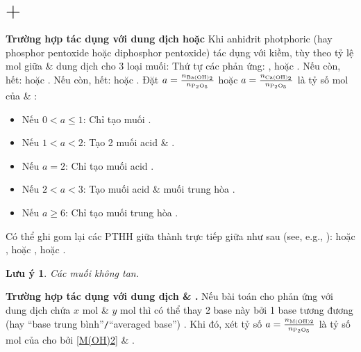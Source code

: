 \documentclass{article}
\newtheorem{luuy}{Lưu ý}
\begin{document}

\section{ $+$ }
\noindent\textbf{\textsf{Trường hợp  tác dụng với dung dịch  hoặc }} Khi anhiđrit photphoric (hay phosphor pentoxide hoặc diphosphor pentoxide)  tác dụng với kiềm, tùy theo tỷ lệ mol giữa  \& dung dịch  cho 3 loại muối: Thứ tự các phản ứng: ,  hoặc . Nếu  còn,  hết:  hoặc . Nếu  còn,  hết:  hoặc . Đặt $a = \frac{n_{\ce{Ba(OH)2}}}{n_{\ce{P2O5}}}$ hoặc $a = \frac{n_{\ce{Ca(OH)2}}}{n_{\ce{P2O5}}}$ là tỷ số mol của  \& :
\begin{itemize}
	\item Nếu $0 < a\le1$: Chỉ tạo muối .
	\item Nếu $1 < a < 2$: Tạo 2 muối acid  \& .
	\item Nếu $a = 2$: Chỉ tạo muối acid .
	\item Nếu $2 < a < 3$: Tạo muối acid  \& muối trung hòa .
	\item Nếu $a\ge6$: Chỉ tạo muối trung hòa .
\end{itemize}
Có thể ghi gom lại các {\rm PTHH} giữa  thành trực tiếp giữa  như sau (see, e.g., \cite[pp. 204--205]{An_chuoi_PUHH}):  hoặc ,  hoặc ,  hoặc .
\begin{luuy}
	Các muối {\rm{}} không tan.
\end{luuy}
\noindent\textbf{\textsf{Trường hợp  tác dụng với dung dịch  \& .}} Nếu bài toán cho  phản ứng với dung dịch chứa $x$ mol  \& $y$ mol  thì có thể thay 2 base này bởi 1 base tương đương (hay ``base trung bình''{\tt/}``averaged base'') . Khi đó, xét tỷ số $a = \frac{n_{\rm M(OH)2}}{n_{\ce{P2O5}}}$ là tỷ số mol của  cho bởi \eqref{M(OH)2} \& .
\end{document}
